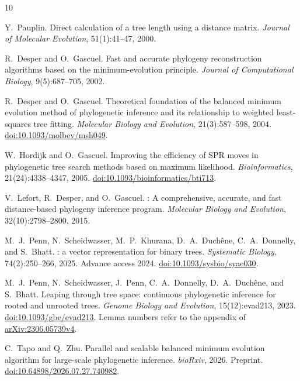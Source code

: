 \begin{thebibliography}{10}

Y.~Pauplin.
\newblock Direct calculation of a tree length using a distance matrix.
\newblock \emph{Journal of Molecular Evolution}, 51(1):41--47, 2000.

R.~Desper and O.~Gascuel.
\newblock Fast and accurate phylogeny reconstruction algorithms based on the minimum-evolution principle.
\newblock \emph{Journal of Computational Biology}, 9(5):687--705, 2002.

R.~Desper and O.~Gascuel.
\newblock Theoretical foundation of the balanced minimum evolution method of phylogenetic inference and its relationship to weighted least-squares tree fitting.
\newblock \emph{Molecular Biology and Evolution}, 21(3):587--598, 2004.
\newblock \href{https://doi.org/10.1093/molbev/msh049}{doi:10.1093/molbev/msh049}.

W.~Hordijk and O.~Gascuel.
\newblock Improving the efficiency of {SPR} moves in phylogenetic tree search methods based on maximum likelihood.
\newblock \emph{Bioinformatics}, 21(24):4338--4347, 2005.
\newblock \href{https://doi.org/10.1093/bioinformatics/bti713}{doi:10.1093/bioinformatics/bti713}.

V.~Lefort, R.~Desper, and O.~Gascuel.
: A comprehensive, accurate, and fast distance-based phylogeny inference program.
\newblock \emph{Molecular Biology and Evolution}, 32(10):2798--2800, 2015.

M.~J.~Penn, N.~Scheidwasser, M.~P.~Khurana, D.~A.~Duch\^ene, C.~A.~Donnelly, and S.~Bhatt.
: a vector representation for binary trees.
\newblock \emph{Systematic Biology}, 74(2):250--266, 2025. Advance access 2024.
\newblock \href{https://doi.org/10.1093/sysbio/syae030}{doi:10.1093/sysbio/syae030}.

M.~J.~Penn, N.~Scheidwasser, J.~Penn, C.~A.~Donnelly, D.~A.~Duch\^ene, and S.~Bhatt.
\newblock Leaping through tree space: continuous phylogenetic inference for rooted and unrooted trees.
\newblock \emph{Genome Biology and Evolution}, 15(12):evad213, 2023.
\newblock \href{https://doi.org/10.1093/gbe/evad213}{doi:10.1093/gbe/evad213}.
\newblock Lemma numbers refer to the appendix of \href{https://arxiv.org/abs/2306.05739v4}{arXiv:2306.05739v4}.

C.~Tapo and Q.~Zhu.
\newblock Parallel and scalable balanced minimum evolution algorithm for large-scale phylogenetic inference.
\newblock \emph{bioRxiv}, 2026. Preprint.
\newblock \href{https://doi.org/10.64898/2026.07.27.740982}{doi:10.64898/2026.07.27.740982}.


\end{thebibliography}

